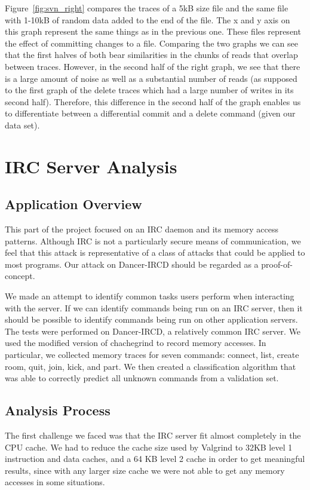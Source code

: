 \documentclass[11pt, oneside]{article}
\newcommand{\fref}[1]{Figure~\ref{#1}}
\begin{document}
\fref{fig:svn_right} compares the traces of a 5kB size file and the same file 
with 1-10kB of random data added to the end of the file. The x and y axis on 
this graph represent the same things as in the previous one. These files 
represent the effect of committing changes to a file. Comparing the two graphs 
we can see that the first halves of both bear similarities in the chunks of 
reads that overlap between traces. However, in the second half of the right 
graph, we see that there is a large amount of noise as well as a substantial 
number of reads (as supposed to the first graph of the delete traces which had 
a large number of writes in its second half). Therefore, this difference in 
the second half of the graph enables us to differentiate between a 
differential commit and a delete command (given our data set).

\section{IRC Server Analysis}
\subsection{Application Overview}
This part of the project focused on an IRC daemon and its memory access 
patterns. Although IRC is not a particularly secure means of communication, we 
feel that this attack is representative of a class of attacks that could be 
applied to most programs. Our attack on Dancer-IRCD should be regarded as a 
proof-of-concept.

We made an attempt to identify common tasks users perform when interacting 
with the server. If we can identify commands being run on an IRC server, then 
it should be possible to identify commands being run on other application 
servers. The tests were performed on Dancer-IRCD, a relatively common IRC 
server. We used the modified version of chachegrind to record memory accesses. 
In particular, we collected memory traces for seven commands: connect, list, 
create room, quit, join, kick, and part. We then created a classification 
algorithm that was able to correctly predict all unknown commands from a 
validation set.

\subsection{Analysis Process}
The first challenge we faced was that the IRC server fit almost completely in 
the CPU cache. We had to reduce the cache size used by Valgrind to 32KB level 
1 instruction and data caches, and a 64 KB level 2 cache in order to get 
meaningful results, since with any larger size cache we were not able to get 
any memory accesses in some situations.
\end{document}
